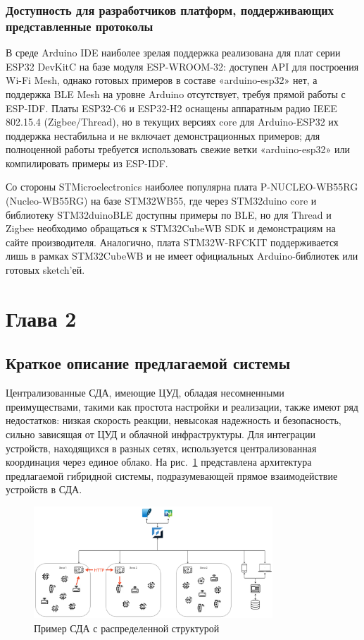 \documentclass[a4paper,12pt]{article}
\begin{document}
\subsubsection{Доступность для разработчиков платформ, поддерживающих представленные протоколы}

В среде Arduino IDE наиболее зрелая поддержка реализована для плат серии ESP32 DevKitC на базе модуля ESP-WROOM-32: доступен API для построения Wi-Fi Mesh,
однако готовых примеров в составе «arduino-esp32» нет, а поддержка BLE Mesh на уровне Arduino отсутствует, требуя прямой работы с ESP-IDF. Платы ESP32-C6 и
ESP32-H2 оснащены аппаратным радио IEEE 802.15.4 (Zigbee/Thread), но в текущих версиях core для Arduino-ESP32 их поддержка нестабильна и не включает
демонстрационных примеров; для полноценной работы требуется использовать свежие ветки «arduino-esp32» или компилировать примеры из ESP-IDF.

Со стороны STMicroelectronics наиболее популярна плата P-NUCLEO-WB55RG (Nucleo-WB55RG) на базе STM32WB55, где через STM32duino core и библиотеку STM32duinoBLE
доступны примеры по BLE, но для Thread и Zigbee необходимо обращаться к STM32CubeWB SDK и демонстрациям на сайте производителя. Аналогично, плата STM32W-RFCKIT
поддерживается лишь в рамках STM32CubeWB и не имеет официальных Arduino-библиотек или готовых sketch’ей.

\newpage

\section{Глава 2}

\subsection{Краткое описание предлагаемой системы}
Централизованные СДА, имеющие ЦУД, обладая несомненными преимуществами, такими как простота настройки и реализации,
также имеют ряд недостатков: низкая скорость реакции, невысокая надежность и безопасность, сильно зависящая от ЦУД
и облачной инфраструктуры. Для интеграции устройств, находящихся в разных сетях, используется централизованная
координация через единое облако. На рис.~\ref{fig:distributed_home_example} представлена архитектура предлагаемой гибридной системы, подразумевающей
прямое взаимодействие устройств в СДА.


\begin{figure}[h]
    \centering
    \includegraphics[width=0.8\textwidth]{images/GlobalSystemDesing.png}
    \caption{Пример СДА с распределенной структурой}
    \label{fig:distributed_home_example}
\end{figure}
\end{document}
